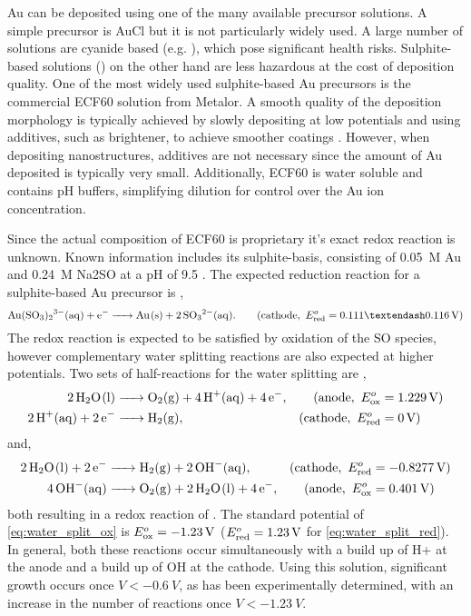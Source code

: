 \documentclass{article}
\begin{document}
Au can be deposited using one of the many available precursor solutions. A simple precursor is AuCl but it is not particularly widely used. A large number of solutions are cyanide based (e.g. ), which pose significant health risks. Sulphite-based solutions () on the other hand are less hazardous at the cost of deposition quality. One of the most widely used sulphite-based Au precursors is the commercial ECF60 solution from Metalor. A smooth quality of the deposition morphology is typically achieved by slowly depositing at low potentials and using additives, such as brightener, to achieve smoother coatings \cite{oniciu1991some}. However, when depositing nanostructures, additives are not necessary since the amount of Au deposited is typically very small. Additionally, ECF60 is water soluble and contains pH buffers\cite{roy2009electrochemical}, simplifying dilution for control over the Au ion concentration.

Since the actual composition of ECF60 is proprietary it's exact redox reaction is unknown. Known information includes its sulphite-basis, consisting of \SI{0.05}{M} Au and \SI{0.24}{M} Na\subs2SO at a pH of 9.5 \cite{roy2009electrochemical}. The expected reduction reaction for a sulphite-based Au precursor is \cite{green2007gold},
\begin{equation}
	\ce{Au(SO3)2^{3-}(aq) + e- -> Au(s) + 2SO3^{2-}(aq)}. \qquad (\mathrm{cathode},\ \Ered=0.111\textendash\SI{0.116}{V})
\end{equation}
The redox reaction is expected to be satisfied by oxidation of the SO species, however complementary water splitting reactions are also expected at higher potentials. Two sets of half-reactions for the water splitting are \cite{haynes2013crc},
\begin{subequations}
\begin{align}
	\ce{2H2O(l) &-> O2(g) + 4H+(aq) + 4e-}, &(\mathrm{anode},\ \Eox&=\SI{1.229}{V}) \label{eq:water_split_ox} \\
	\ce{2H+(aq) + 2e- &-> H2(g)}, &(\mathrm{cathode},\ \Ered&=\SI{0}{V})
\end{align}
\end{subequations}
and,
\begin{subequations}
\begin{align}
	\ce{2H2O(l) + 2e- &-> H2(g) + 2OH^-(aq)}, &(\mathrm{cathode},\ \Ered&=\SI{-0.8277}{V}) \label{eq:water_split_red} \\
	\ce{4OH^-(aq) &-> O2(g) + 2H2O(l) + 4e-}, &(\mathrm{anode},\ \Eox&=\SI{0.401}{V})
\end{align}
\end{subequations}
both resulting in a redox reaction of . The standard potential of \eqref{eq:water_split_ox} is $E^o_{\mathrm{ox}}=\SI{-1.23}{V}$ ($E^o_{\mathrm{red}}=\SI{1.23}{V}$ for \eqref{eq:water_split_red}). In general, both these reactions occur simultaneously with a build up of H\sups+ at the anode and a build up of OH\sups{\textminus} at the cathode. %
Using this solution, significant growth occurs once $V<\SI{-0.6}{V}$, as has been experimentally determined, with an increase in the number of reactions once $V<\SI{-1.23}{V}$.
\end{document}
